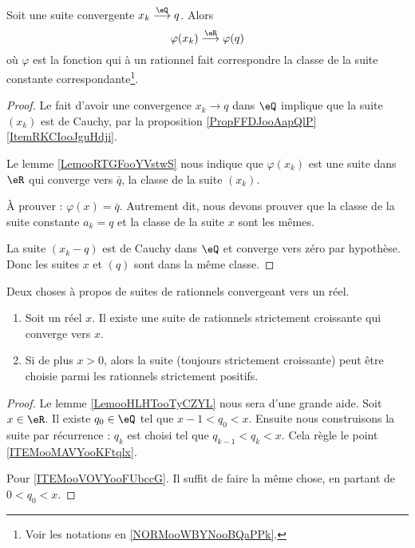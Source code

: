 \begin{proposition}     \label{PROPooZSQYooWRKNGY}
	Soit une suite convergente \( x_k\stackrel{\eQ}{\longrightarrow}q\). Alors
	\begin{equation}
		\varphi(x_k)\stackrel{\eR}{\longrightarrow}\varphi(q)
	\end{equation}
	où \( \varphi\) est la fonction qui à un rationnel fait correspondre la classe de la suite constante correspondante\footnote{Voir les notations en \ref{NORMooWBYNooBQaPPk}.}.
\end{proposition}

\begin{proof}
	Le fait d'avoir une convergence \( x_k\to q\) dans \( \eQ\) implique que la suite \( (x_k)\) est de Cauchy, par la proposition \ref{PropFFDJooAapQlP}\ref{ItemRKCIooJguHdji}.

	Le lemme \ref{LemooRTGFooYVstwS} nous indique que \( \varphi(x_k)\) est une suite dans \( \eR\) qui converge vers \( \bar q\), la classe de la suite \( (x_k)\).

	À prouver : \( \varphi(x)=\bar q\). Autrement dit, nous devons prouver que la classe de la suite constante \( a_k=q\) et la classe de la suite \( x\) sont les mêmes.

	La suite \( (x_k-q)\) est de Cauchy dans \( \eQ\) et converge vers zéro par hypothèse. Donc les suites \(x\) et \( (q)\) sont dans la même classe.
\end{proof}

\begin{proposition}     \label{PROPooFGBOooHiZqbs}
	Deux choses à propos de suites de rationnels convergeant vers un réel.
	\begin{enumerate}
		\item       \label{ITEMooMAVYooKFtqlx}
		      Soit un réel \( x\). Il existe une suite de rationnels strictement croissante qui converge vers \( x\).
		\item       \label{ITEMooVOVYooFUbccG}
		      Si de plus \( x>0\), alors la suite (toujours strictement croissante) peut être choisie parmi les rationnels strictement positifs.
	\end{enumerate}
\end{proposition}

\begin{proof}
	Le lemme \ref{LemooHLHTooTyCZYL} nous sera d'une grande aide. Soit \( x\in \eR\). Il existe \( q_0\in \eQ\) tel que \( x-1<q_0<x\). Ensuite nous construisons la suite par récurrence : \( q_k\) est choisi tel que \( q_{k-1}<q_k<x\). Cela règle le point \ref{ITEMooMAVYooKFtqlx}.

	Pour \ref{ITEMooVOVYooFUbccG}. Il suffit de faire la même chose, en partant de \( 0<q_0<x\).
\end{proof}

